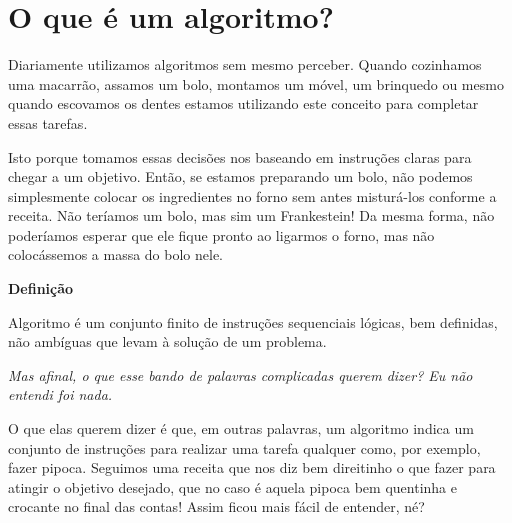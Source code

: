 \documentclass[conference]{IEEEtran}
\begin{document}
\section{\textbf{O que é um algoritmo?}}
    Diariamente utilizamos algoritmos sem mesmo perceber. Quando cozinhamos uma macarrão, assamos um bolo, montamos um móvel, um brinquedo ou mesmo quando escovamos os dentes estamos utilizando este conceito para completar essas tarefas.
    \par
    Isto porque tomamos essas decisões nos baseando em instruções claras para chegar a um objetivo. Então, se estamos preparando um bolo, não podemos simplesmente colocar os ingredientes no forno sem antes misturá-los conforme a receita. Não teríamos um bolo, mas sim um Frankestein! Da mesma forma, não poderíamos esperar que ele fique pronto ao ligarmos o forno, mas não colocássemos a massa do bolo nele.
    \begin{center}
        \textbf{Definição}
    \end{center}
    \par
    Algoritmo é um conjunto finito de instruções sequenciais lógicas, bem definidas, não ambíguas que levam à solução de um problema.
    \par
    \textit{Mas afinal, o que esse bando de palavras complicadas querem dizer? Eu não entendi foi nada.}
    \par
    O que elas querem dizer é que, em outras palavras, um algoritmo indica um conjunto de instruções para realizar uma tarefa qualquer como, por exemplo, fazer pipoca. Seguimos uma receita que nos diz bem direitinho o que fazer para atingir o objetivo desejado, que no caso é aquela pipoca bem quentinha e crocante no final das contas! Assim ficou mais fácil de entender, né?
\end{document}
